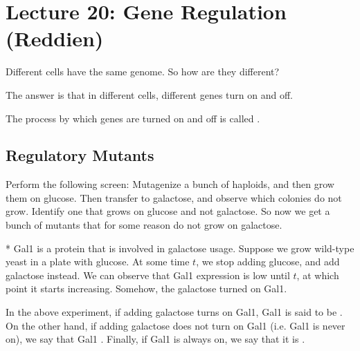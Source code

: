 \section*{Lecture 20: Gene Regulation (Reddien)}
\setcounter{section}{20}

\begin{que}
	Different cells have the same genome. 
	So how are they different?
\end{que}

The answer is that in different cells, different genes turn on and off.

\begin{defn}
	The process by which genes are turned on and off is called .
\end{defn}

\subsection{Regulatory Mutants}

\begin{exper}
	Perform the following screen: Mutagenize a bunch of haploids, and then grow them on glucose. Then transfer to galactose, and observe which colonies do not grow. Identify one that grows on glucose and not galactose.
	So now we get a bunch of mutants that for some reason do not grow on galactose.
\end{exper}

\begin{exper}*
	Gal1 is a protein that is involved in galactose usage.
	Suppose we grow wild-type yeast in a plate with glucose. At some time $t$, we stop adding glucose, and add galactose instead.
	We can observe that Gal1 expression is low until $t$, at which point it starts increasing. 
	Somehow, the galactose turned on Gal1.
\end{exper}

\begin{defn}
	In the above experiment, if adding galactose turns on Gal1, Gal1 is said to be .
	On the other hand, if adding galactose does not turn on Gal1 (i.e. Gal1 is never on), we say that Gal1 .
	Finally, if Gal1 is always on, we say that it is .
\end{defn}

